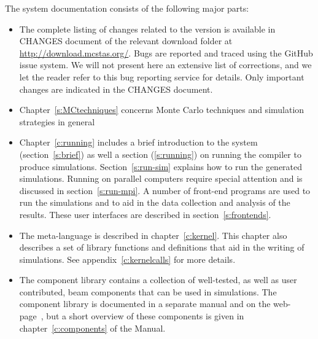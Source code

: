 The \MCS system documentation consists of the following major
parts:
\begin{itemize}
\item The complete listing of changes related to the version \MCS \version
is available in CHANGES document of the relevant download folder at
\url{http://download.mcstas.org/}. Bugs are reported and traced using
the \MCS GitHub issue system\cite{mczilla_webpage}. We will not
present here an extensive list of corrections, and we let the reader
refer to this bug reporting service for details. Only important
changes are indicated in the CHANGES document.
\item Chapter~\ref{s:MCtechniques} concerns Monte Carlo techniques
  and simulation strategies in general
\item Chapter~\ref{c:running} includes a brief introduction to the
  \MCS system
  (section~\ref{s:brief}) as well a section (\ref{s:running}) on running the compiler to produce
  simulations. Section~\ref{s:run-sim} explains how to run the generated
  simulations. Running \MCS on parallel computers require special
  attention and is discussed in section~\ref{s:run-mpi}. A number of front-end programs are used to run the
  simulations and to aid in the data collection and analysis of the
  results. These user interfaces are described in section~\ref{s:frontends}.
\item The \MCS meta-language is described in chapter~\ref{c:kernel}. This
  chapter also describes a set of library functions and definitions
  that aid in the writing of simulations. See
  appendix~\ref{c:kernelcalls} for more details.
\item The \MCS component library contains a collection of
  well-tested, as well as user contributed, beam components that can be used in simulations.
  The \MCS component library is documented in a separate manual
  and on the \MCS web-page~\cite{mcstas_webpage}, but a short overview of these
  components is given in chapter~\ref{c:components} of the Manual.

\end{itemize}

